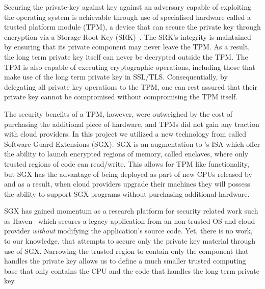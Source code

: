\documentclass[../main.tex]{subfiles}
\begin{document}
Securing the private-key against key against an adversary capable of
exploiting the operating system is achievable through use
of specialised hardware called a trusted platform module (TPM), a
device that can secure the private key through encryption via a
Storage Root Key (SRK)~\cite{tpm10}. The SRK's integrity is maintained
by ensuring that its private component may never leave the TPM. As a
result, the long term private key itself can never be decrypted
outside the TPM. The TPM is also capable of executing cryptographic
operations, including those that make use of the long term private key
in SSL/TLS. Consequentially, by delegating all private key operations
to the TPM, one can rest assured that their private key cannot be
compromised without compromising the TPM itself.

The security benefits of a TPM, however, were outweighed by the cost
of purchasing the additional piece of hardware, and TPMs did not gain
any traction with cloud providers. In this project we utilized a new
technology from \Intel called Software Guard Extensions (SGX). SGX is
an augmentation to \Intel's ISA which offer the ability to launch
encrypted regions of memory, called enclaves, where only trusted
regions of code can read/write. This allows for TPM like
functionality, but SGX has the advantage of being deployed as part of
new CPUs released by \Intel and as a result, when cloud providers
upgrade their machines they will possess the ability to support SGX
programs without purchasing additional hardware.

SGX has gained momentum as a research platform for security related
work such as Haven~\cite{Baumann14} which secures a legacy application
from an non-trusted OS and cloud-provider \textit{without} modifying
the application's source code.  Yet, there is no work, to our
knowledge, that attempts to secure only the private key material
through use of SGX. Narrowing the trusted region to contain only the
component that handles the private key allows us to define a much
smaller trusted computing base that only contains the CPU and the code
that handles the long term private key. 
\end{document}
